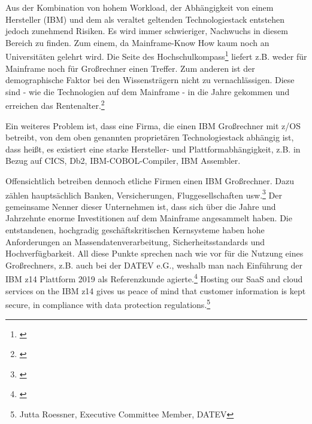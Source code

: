 Aus der Kombination von hohem Workload, der Abhängigkeit von einem Hersteller (IBM) und dem als veraltet geltenden Technologiestack entstehen jedoch zunehmend Risiken.
Es wird immer schwieriger, Nachwuchs in diesem Bereich zu finden.
Zum einem, da Mainframe-Know How kaum noch an Universitäten gelehrt wird.
Die Seite des Hochschulkompass\footnote{\cite{.09.02.2020}} liefert z.B. weder für \glqq Mainframe\grqq{} noch für \glqq Großrechner\grqq{} einen Treffer.
Zum anderen ist der demographische Faktor bei den Wissensträgern nicht zu vernachlässigen. Diese sind - wie die Technologien auf dem Mainframe - in die Jahre gekommen und erreichen das Rentenalter.\footnote{\cite{.25.2.2020f}}

Ein weiteres Problem ist, dass eine Firma, die einen IBM Großrechner mit z/OS betreibt, von dem oben genannten proprietären Technologiestack abhängig ist, dass heißt, es existiert eine starke Hersteller- und Plattformabhängigkeit, z.B. in Bezug auf CICS, Db2, IBM-COBOL-Compiler, IBM Assembler.

Offensichtlich betreiben dennoch etliche Firmen einen IBM Großrechner.
Dazu zählen hauptsächlich Banken, Versicherungen, Fluggesellschaften usw.\footnote{\cite{.25.2.2020c}}
Der gemeinsame Nenner dieser Unternehmen ist, dass sich über die Jahre und Jahrzehnte enorme Investitionen auf dem Mainframe angesammelt haben.
Die entstandenen, hochgradig geschäftskritischen Kernsysteme haben hohe Anforderungen an Massendatenverarbeitung, Sicherheitsstandards und Hochverfügbarkeit.
All diese Punkte sprechen nach wie vor für die Nutzung eines Großrechners, z.B. auch bei der DATEV e.G., weshalb man nach Einführung der IBM z14 Plattform 2019 als Referenzkunde agierte.\footnote{\cite{.29.02.2020}}
\glqq Hosting our SaaS and cloud services on the IBM z14 gives us peace of mind that customer information is kept secure, in compliance with data protection regulations.\grqq\footnote{Jutta Roessner, Executive Committee Member, DATEV}

